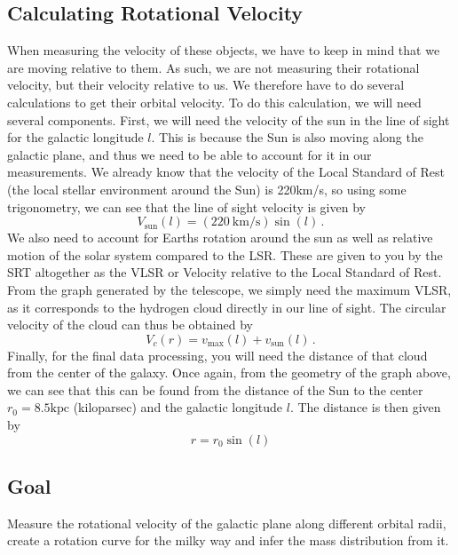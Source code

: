 \subsection{Calculating Rotational Velocity}
When measuring the velocity of these objects, we have to keep in mind that we are moving relative to them. As such, we are not measuring their rotational velocity, but their velocity relative to us. We therefore have to do several calculations to get their orbital velocity. To do this calculation, we will need several components. First, we will need the velocity of the sun in the line of sight for the galactic longitude $l$. This is because the Sun is also moving along the galactic plane, and thus we need to be able to account for it in our measurements. We already know that the velocity of the Local Standard of Rest (the local stellar environment around the Sun) is 220km/s, so using some trigonometry, we can see that the line of sight velocity is given by
\begin{equation}
V_\textrm{sun}(l) = (220\:\mathrm{km}/\mathrm{s}) \sin(l) \,.
\end{equation}
We also need to account for Earths rotation around the sun as well as relative motion of the solar system compared to the LSR. These are given to you by the SRT altogether as the VLSR or Velocity relative to the Local Standard of Rest. From the graph generated by the telescope, we simply need the maximum VLSR, as it corresponds to the hydrogen cloud directly in our line of sight. The circular velocity of the cloud can thus be obtained by
\begin{equation}
V_c(r) = v_\textrm{max} (l) + v_\textrm{sun}(l) \,.
\end{equation}
Finally, for the final data processing, you will need the distance of that cloud from the center of the galaxy. Once again, from the geometry of the graph above, we can see that this can be found from the distance of the Sun to the center $r_0 = 8.5\textrm{kpc}$ (kiloparsec) and the galactic longitude $l$. The distance is then given by
\begin{equation}
r = r_0 \sin(l)
\end{equation}


\subsection{Goal}
Measure the rotational velocity of the galactic plane along different orbital radii, create a rotation curve for the milky way and infer the mass distribution from it.
